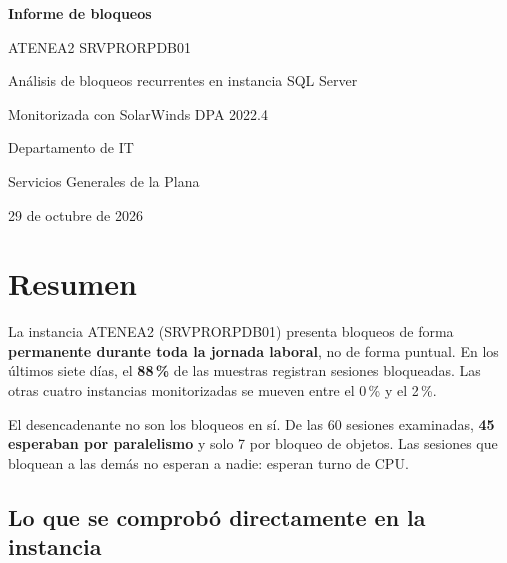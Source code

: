\documentclass[11pt,a4paper]{article}
\newcommand{\critico}[1]{\textcolor{rojo}{\textbf{#1}}}
\begin{document}
\begin{titlepage}
\centering
\vspace*{3cm}
{\Huge\bfseries Informe de bloqueos\par}
\vspace{0.6cm}
{\LARGE ATENEA2 \textemdash{} SRVPRORPDB01\par}
\vspace{1.4cm}
{\large Análisis de bloqueos recurrentes en instancia SQL Server\par}
\vspace{0.4cm}
{\large\color{gris} Monitorizada con SolarWinds DPA 2022.4\par}
\vfill
{\large Departamento de IT\par}
{\large Servicios Generales de la Plana\par}
\vspace{0.8cm}
{\large 29 de octubre de 2026\par}
\vspace{2cm}
\end{titlepage}

\tableofcontents
\newpage

\section{Resumen}

La instancia ATENEA2 (SRVPRORPDB01) presenta bloqueos de forma
\textbf{permanente durante toda la jornada laboral}, no de forma puntual.
En los últimos siete días, el \critico{88\,\%} de las muestras registran
sesiones bloqueadas. Las otras cuatro instancias monitorizadas se mueven
entre el 0\,\% y el 2\,\%.

El desencadenante no son los bloqueos en sí. De las 60 sesiones
examinadas, \textbf{45 esperaban por paralelismo} y solo 7 por bloqueo de
objetos. Las sesiones que bloquean a las demás no esperan a nadie: esperan
turno de CPU.

\subsection*{Lo que se comprobó directamente en la instancia}
\end{document}
